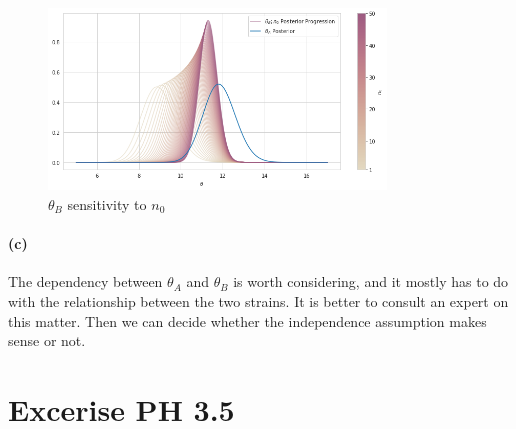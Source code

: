 \documentclass[11pt, letterpaper]{article}
\begin{document}
\begin{figure}[!h]
  \centering
  \includegraphics[width=0.8\textwidth]{3.3.b.png}
  \captionsetup{justification=centering}
  \caption{$\theta_B$ sensitivity to $n_0$}
\end{figure}

\paragraph{(c)}
The dependency between $\theta_A$ and $\theta_B$ is worth considering, and it mostly has to do with the
relationship between the two strains. It is better to consult an expert on this matter. Then we can decide
whether the independence assumption makes sense or not. 
\newpage

\section{Excerise PH 3.5}
\end{document}
